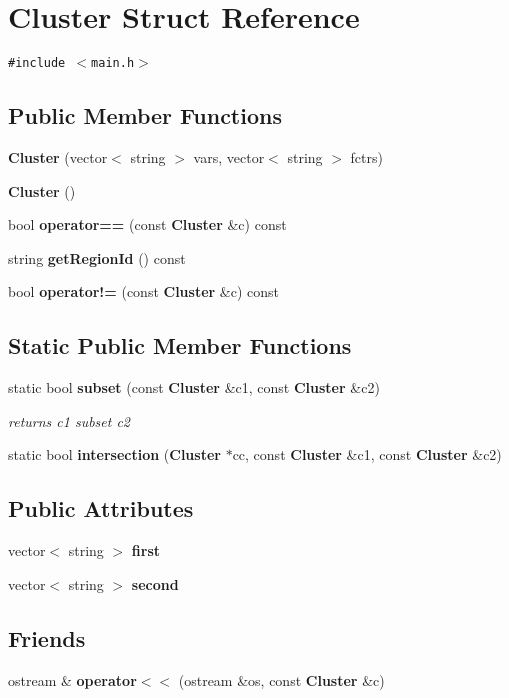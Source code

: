 \section{Cluster Struct Reference}
\label{structCluster}
{\tt \#include $<$main.h$>$}

\subsection*{Public Member Functions}
\begin{CompactItemize}
\item 
{\bf Cluster} (vector$<$ string $>$ vars, vector$<$ string $>$ fctrs)
\item 
{\bf Cluster} ()
\item 
bool {\bf operator==} (const {\bf Cluster} \&c) const 
\item 
string {\bf getRegionId} () const
\item 
bool {\bf operator!=} (const {\bf Cluster} \&c) const 
\end{CompactItemize}
\subsection*{Static Public Member Functions}
\begin{CompactItemize}
\item 
static bool {\bf subset} (const {\bf Cluster} \&c1, const {\bf Cluster} \&c2)
\begin{CompactList}\small\item\em returns c1 subset c2 \item\end{CompactList}\item 
static bool {\bf intersection} ({\bf Cluster} $\ast$cc, const {\bf Cluster} \&c1, const {\bf Cluster} \&c2)
\end{CompactItemize}
\subsection*{Public Attributes}
\begin{CompactItemize}
\item 
vector$<$ string $>$ {\bf first}
\item 
vector$<$ string $>$ {\bf second}
\end{CompactItemize}
\subsection*{Friends}
\begin{CompactItemize}
\item 
ostream \& {\bf operator$<$$<$} (ostream \&os, const {\bf Cluster} \&c)
\end{CompactItemize}


